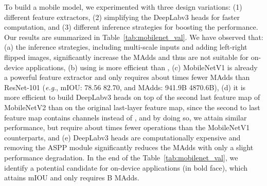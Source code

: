 \documentclass[10pt,twocolumn,letterpaper]{article}
\def\eg{\emph{e.g}.}
\begin{document}
To build a mobile model, we experimented with three design variations: (1) different feature extractors, (2) simplifying the \mbox{DeepLabv3} heads for faster computation, and (3) different inference strategies for boosting the performance.
Our results are summarized in Table~\ref{tab:mobilenet_val}.
We have observed that: (a) the inference strategies, including multi-scale inputs and adding left-right flipped images, significantly increase the MAdds and thus are not suitable for on-device applications, (b) using  is more efficient than , (c) \mbox{MobileNetV1} is already a powerful feature extractor and only requires about  times fewer MAdds than ResNet-101 \cite{ResNet} (\eg, mIOU: 78.56  82.70, and MAdds: 941.9B  4870.6B), (d) it is more efficient to build \mbox{DeepLabv3} heads on top of the second last feature map of \mbox{MobileNetV2} than on the original last-layer feature map, since the second to last feature map contains  channels instead of , and by doing so, we attain similar performance, but require about  times fewer operations than the \mbox{MobileNetV1} counterparts, and (e) \mbox{DeepLabv3} heads are computationally expensive and removing the ASPP module significantly reduces the MAdds with only a slight performance degradation.
In the end of the Table~\ref{tab:mobilenet_val}, we identify a potential candidate for on-device applications (in bold face), which attains  mIOU and only requires B MAdds.
\end{document}
